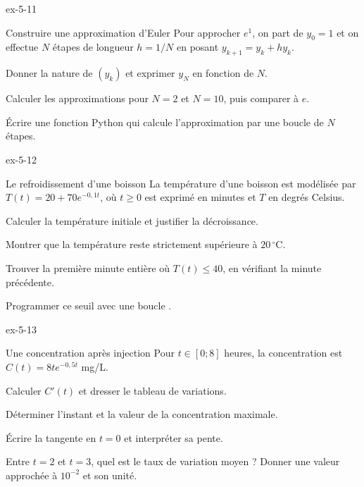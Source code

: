 \begin{blocLivre}{ex-5-11}
\begin{exercice}[2]{Construire une approximation d'Euler}
Pour approcher $e^1$, on part de $y_0=1$ et on effectue $N$ étapes de longueur
$h=1/N$ en posant $y_{k+1}=y_k+hy_k$.
\begin{questions}\item Donner la nature de $(y_k)$ et exprimer $y_N$ en fonction de $N$.
\item Calculer les approximations pour $N=2$ et $N=10$, puis comparer à $e$.
\item Écrire une fonction Python qui calcule l'approximation par une boucle de $N$ étapes.
\end{questions}
\end{exercice}
\end{blocLivre}
\clearpage
{}
\begin{blocLivre}{ex-5-12}
\begin{exercice}[3]{Le refroidissement d'une boisson}
La température d'une boisson est modélisée par $T(t)=20+70e^{-0{,}1t}$,
où $t\geq0$ est exprimé en minutes et $T$ en degrés Celsius.
\begin{center}\end{center}
\begin{questions}\item Calculer la température initiale et justifier la décroissance.
\item Montrer que la température reste strictement supérieure à $20\,{}^\circ$C.
\item Trouver la première minute entière où $T(t)\leq40$, en vérifiant la minute précédente.
\item Programmer ce seuil avec une boucle .
\end{questions}
\end{exercice}
\end{blocLivre}
\begin{blocLivre}{ex-5-13}
\begin{exercice}[3]{Une concentration après injection}
Pour $t\in[0;8]$ heures, la concentration est $C(t)=8te^{-0{,}5t}$ mg/L.
\begin{questions}\item Calculer $C'(t)$ et dresser le tableau de variations.
\item Déterminer l'instant et la valeur de la concentration maximale.
\item Écrire la tangente en $t=0$ et interpréter sa pente.
\item Entre $t=2$ et $t=3$, quel est le taux de variation moyen ? Donner une valeur approchée à $10^{-2}$ et son unité.
\end{questions}
\end{exercice}
\end{blocLivre}
